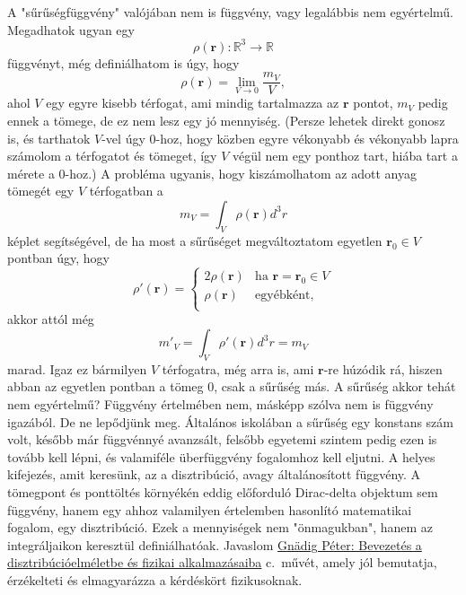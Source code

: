 \documentclass[12pt,a4paper]{scrartcl}
\let\mathbf\bm
\begin{document}
A "sűrűségfüggvény" valójában nem is függvény, vagy legalábbis nem egyértelmű. Megadhatok ugyan egy 
\[\rho \left( {\mathbf{r}} \right):{\mathbb{R}^3} \to \mathbb{R}\]
függvényt, még definiálhatom is úgy, hogy 
\[\rho \left( {\mathbf{r}} \right) = \mathop {\lim }\limits_{V \to 0} \frac{{{m_V}}}{V},\]
ahol $V$ egy egyre kisebb térfogat, ami mindig tartalmazza az ${\mathbf{r}}$ pontot, ${{m_V}}$ pedig ennek a tömege, de ez nem lesz egy jó mennyiség. (Persze lehetek direkt gonosz is, és tarthatok $V$-vel úgy 0-hoz, hogy közben egyre vékonyabb és vékonyabb lapra számolom a térfogatot és tömeget, így $V$ végül nem egy ponthoz tart, hiába tart a mérete a 0-hoz.) A probléma ugyanis, hogy kiszámolhatom az adott anyag tömegét egy $V$ térfogatban a
\[{m_V} = \int_V {\rho \left( {\mathbf{r}} \right){d^3}r} \]
képlet segítségével, de ha most a sűrűséget megváltoztatom egyetlen ${{\mathbf{r}}_0} \in V$ pontban úgy, hogy 
\[\rho '\left( {\mathbf{r}} \right) = \left\{ \begin{array}{lr}
  2\rho \left( {\mathbf{r}} \right)&{\text{ha }}{\mathbf{r}} = {{\mathbf{r}}_0} \in V \\
  \rho \left( {\mathbf{r}} \right)&{\text{egyébként,}} \\ 
\end{array}  \right.\]
akkor attól még
\begin{equation} \label{eq:ugyanaz_a_tomeg}
m{'_V} = \int_V {\rho '\left( {\mathbf{r}} \right){d^3}r}  = {m_V}
\end{equation}
marad. Igaz ez bármilyen $V$ térfogatra, még arra is, ami ${\mathbf{r}}$-re húzódik rá, hiszen abban az egyetlen pontban a tömeg 0, csak a sűrűség más. A sűrűség akkor tehát nem egyértelmű? Függvény értelmében nem, másképp szólva nem is függvény igazából. De ne lepődjünk meg. Általános iskolában a sűrűség egy konstans szám volt, később már függvénnyé avanzsált, felsőbb egyetemi szintem pedig ezen is tovább kell lépni, és valamiféle überfüggvény fogalomhoz kell eljutni. A helyes kifejezés, amit keresünk, az a disztribúció, avagy általánosított függvény. A tömegpont és ponttöltés környékén eddig előforduló Dirac-delta objektum sem függvény, hanem egy ahhoz valamilyen értelemben hasonlító matematikai fogalom, egy disztribúció. Ezek a mennyiségek nem "önmagukban", hanem az integráljaikon keresztül definiálhatóak. Javaslom \href{http://physics.bme.hu/sites/physics.bme.hu/files/users/BMETE15AF31_kov/2012Gnadig_II.pdf}{Gnädig Péter: Bevezetés a disztribúcióelméletbe és fizikai alkalmazásaiba} c.\ művét, amely jól bemutatja, érzékelteti és elmagyarázza a kérdéskört fizikusoknak.
\end{document}
